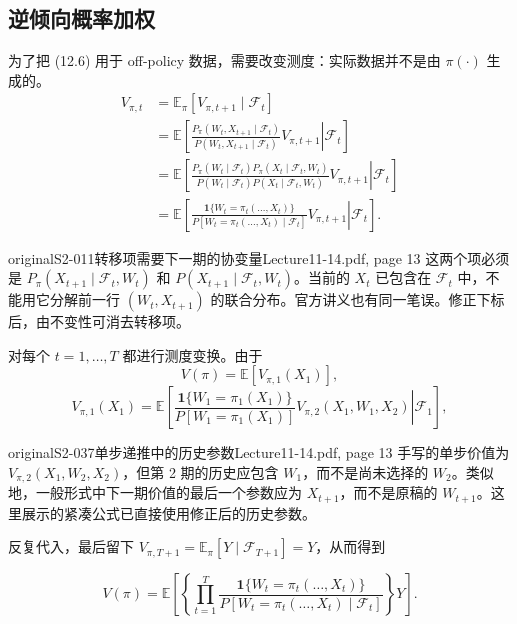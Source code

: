 \subsection{逆倾向概率加权}
为了把 (12.6) 用于 off-policy 数据，需要改变测度：实际数据并不是由 $\pi(\cdot)$ 生成的。
\begin{align*}
 V_{\pi,t}
 &=\mathbb E_\pi[V_{\pi,t+1}\mid\mathcal F_t]\\
 &=\mathbb E\left[\left.
 \frac{P_\pi(W_t,X_{t+1}\mid\mathcal F_t)}
 {P(W_t,X_{t+1}\mid\mathcal F_t)}V_{\pi,t+1}
 \right|\mathcal F_t\right]\\
 &=\mathbb E\left[\left.
 \frac{P_\pi(W_t\mid\mathcal F_t)P_\pi(X_t\mid\mathcal F_t,W_t)}
 {P(W_t\mid\mathcal F_t)P(X_t\mid\mathcal F_t,W_t)}
 V_{\pi,t+1}\right|\mathcal F_t\right]\\
 &=\mathbb E\left[\left.
 \frac{\mathbf1\{W_t=\pi_t(\ldots,X_t)\}}
 {P[W_t=\pi_t(\ldots,X_t)\mid\mathcal F_t]}
 V_{\pi,t+1}\right|\mathcal F_t\right].
\end{align*}

\begin{reviewnote}{original}{S2-011}{转移项需要下一期的协变量}{Lecture11-14.pdf, page 13}
这两个项必须是 $P_\pi(X_{t+1}\mid\mathcal F_t,W_t)$ 和 $P(X_{t+1}\mid\mathcal F_t,W_t)$。当前的 $X_t$ 已包含在 $\mathcal F_t$ 中，不能用它分解前一行 $(W_t,X_{t+1})$ 的联合分布。官方讲义也有同一笔误。修正下标后，由不变性可消去转移项。
\end{reviewnote}


对每个 $t=1,\ldots,T$ 都进行测度变换。由于
\[
 V(\pi)=\mathbb E[V_{\pi,1}(X_1)],
\]
\[
 V_{\pi,1}(X_1)=\mathbb E\left[\left.
 \frac{\mathbf1\{W_1=\pi_1(X_1)\}}
 {P[W_1=\pi_1(X_1)]}
 V_{\pi,2}(X_1,W_1,X_2)\right|\mathcal F_1\right],
\]
\begin{reviewnote}{original}{S2-037}{单步递推中的历史参数}{Lecture11-14.pdf, page 13}
手写的单步价值为 $V_{\pi,2}(X_1,W_2,X_2)$，但第 2 期的历史应包含 $W_1$，而不是尚未选择的 $W_2$。类似地，一般形式中下一期价值的最后一个参数应为 $X_{t+1}$，而不是原稿的 $W_{t+1}$。这里展示的紧凑公式已直接使用修正后的历史参数。
\end{reviewnote}

反复代入，最后留下 $V_{\pi,T+1}=\mathbb E_\pi[Y\mid\mathcal F_{T+1}]=Y$，从而得到



\[
 V(\pi)=\mathbb E\left[
 \left\{\prod_{t=1}^T
 \frac{\mathbf1\{W_t=\pi_t(\ldots,X_t)\}}
 {P[W_t=\pi_t(\ldots,X_t)\mid\mathcal F_t]}\right\}Y\right].
\]

